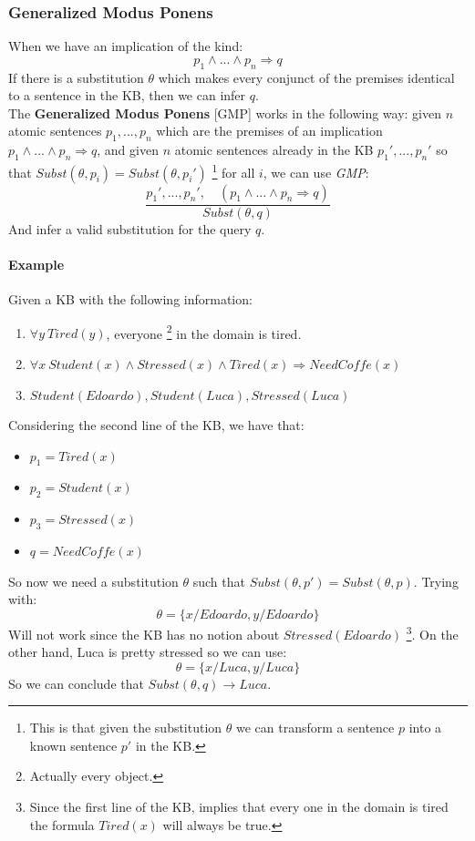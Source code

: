 \documentclass[10pt,a4paper]{article}
\begin{document}
\subsubsection{Generalized Modus Ponens}


When we have an implication of the kind:
\[p_1 \wedge ... \wedge p_n \Rightarrow q\]
If there is a substitution $\theta$ which makes every conjunct of the premises identical to a sentence in the KB, then we can infer $q$.\\
The \textbf{Generalized Modus Ponens} [GMP] works in the following way: given $n$ atomic sentences $p_1,...,p_n$ which are the premises of an implication $p_1\wedge ... \wedge p_n\Rightarrow q$, and given $n$ atomic sentences already in the KB $p_1',...,p_n'$ so that $Subst(\theta,p_i)=Subst(\theta,p_i')$ \footnote{This is that given the substitution $\theta$ we can transform a sentence $p$ into a known sentence $p'$ in the KB.} for all $i$, we can use \textit{GMP}:
\[\frac{p_1',...,p_n',\quad (p_1\wedge ... \wedge p_n\Rightarrow q)}{Subst(\theta,q)}\]
And infer a valid substitution for the query $q$.\\

\paragraph{Example}
Given a KB with the following information:
\begin{enumerate}
\item $\forall y\ Tired(y)$, everyone \footnote{Actually every object.} in the domain is tired.
\item $\forall x\ Student(x)\wedge Stressed(x) \wedge Tired(x) \Rightarrow NeedCoffe(x)$
\item $Student(Edoardo),Student(Luca), Stressed(Luca)$
\end{enumerate}

Considering the second line of the KB, we have that:
\begin{itemize}
\item $p_1=Tired(x)$
\item $p_2=Student(x)$
\item $p_3=Stressed(x)$
\item $q=NeedCoffe(x)$
\end{itemize}

So now we need a substitution $\theta$ such that $Subst(\theta,p')=Subst(\theta,p)$. Trying with:
\[\theta=\lbrace x/Edoardo, y/Edoardo \rbrace\]
Will not work since the KB has no notion about $Stressed(Edoardo)$ \footnote{Since the first line of the KB, implies that every one in the domain is tired the formula $Tired(x)$ will always be true. }. On the other hand, Luca is pretty stressed so we can use:
\[\theta=\lbrace x/Luca, y/Luca \rbrace\]
So we can conclude that $Subst(\theta, q)\longrightarrow Luca$.\\
\end{document}
